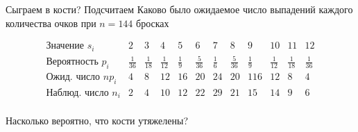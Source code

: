 \documentclass[unicode,11pt,notheorems,xcolor=table]{beamer}
\begin{document}
\begin{frame}{Сыграем в кости?}{}
    Подсчитаем Каково было ожидаемое число выпадений каждого количества очков при $n=144$ бросках
    
    $$
    \begin{array}{l|ccccccccccc}
        \text{Значение } s_i & 2 & 3 & 4 & 5 & 6 & 7 & 8& 9& 10& 11& 12 \\
        \hline
        \text{Вероятность }p_i & \frac{1}{36} & \frac{1}{18} & \frac{1}{12} & \frac{1}{9} & \frac{5}{36} & \frac{1}{6} & \frac{5}{36} & \frac{1}{9}& \frac{1}{12}& \frac{1}{18}& \frac{1}{36}\\
        \hline
       \text{Ожид. число } np_i & 4 & 8 & 12 & 16 & 20 & 24 & 20& 116& 12& 8& 4 \\ 
        \hline
        \hline
        \text{Наблюд. число } n_i & 2 & 4 & 10 & 12 & 22 & 29 & 21& 15& 14& 9& 6 \\
    \end{array}        
    $$

    Насколько вероятно, что кости утяжелены?
\end{frame}
\end{document}
